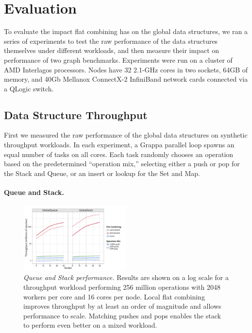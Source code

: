 \section{Evaluation}
To evaluate the impact flat combining has on the global data structures, we ran a series of experiments to test the raw performance of the data structures themselves under different workloads, and then measure their impact on performance of two graph benchmarks.
Experiments were run on a cluster of AMD Interlagos processors. Nodes have 32 2.1-GHz cores in two sockets, 64GB of memory, and 40Gb Mellanox ConnectX-2 InfiniBand network cards connected via a QLogic switch.

\subsection{Data Structure Throughput}
First we measured the raw performance of the global data structures on synthetic throughput workloads. In each experiment, a Grappa parallel loop spawns an equal number of tasks on all cores. Each task randomly chooses an operation based on the predetermined ``operation mix,'' selecting either a push or pop for the Stack and Queue, or an insert or lookup for the Set and Map.

\paragraph{Queue and Stack.}
\begin{figure}[t]
  \centering
  \includegraphics[width=0.5\textwidth]{data/plots/vector_perf.pdf}
  \caption{\emph{Queue and Stack performance.}
    Results are shown on a log scale for a throughput workload performing 256 million operations with 2048 workers per core and 16 cores per node. Local flat combining improves throughput by at least an order of magnitude and allows performance to scale. Matching pushes and pops enables the stack to perform even better on a mixed workload.
  }
  \label{fig:vector}
\end{figure}

